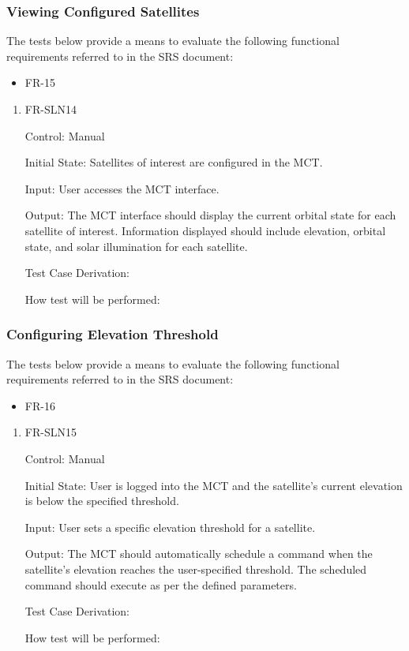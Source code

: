 \documentclass[12pt, titlepage]{article}
\begin{document}
\subsubsection{Viewing Configured Satellites}

The tests below provide a means to evaluate the following functional requirements referred to in the SRS document:
\begin{itemize}
    \item FR-15
\end{itemize}

\begin{enumerate}

\item{FR-SLN14\\}

Control: Manual
					
Initial State: Satellites of interest are configured in the MCT.
	
Input: User accesses the MCT interface.
					
Output: The MCT interface should display the current orbital state for each satellite of interest. Information displayed should include elevation, orbital state, and solar illumination for each satellite.

Test Case Derivation:
					
How test will be performed:

\end{enumerate}


\subsubsection{Configuring Elevation Threshold}

The tests below provide a means to evaluate the following functional requirements referred to in the SRS document:
\begin{itemize}
    \item FR-16
\end{itemize}

\begin{enumerate}

\item{FR-SLN15\\}

Control: Manual
					
Initial State: User is logged into the MCT and the satellite's current elevation is below the specified threshold.
	
Input: User sets a specific elevation threshold for a satellite.
					
Output: The MCT should automatically schedule a command when the satellite's elevation reaches the user-specified threshold. The scheduled command should execute as per the defined parameters.

Test Case Derivation:
					
How test will be performed:

\end{enumerate}
\end{document}

